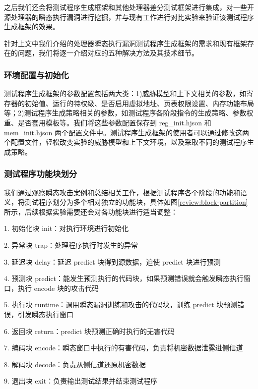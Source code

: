 之后我们还会将测试程序生成框架和其他处理器差分测试框架进行集成，对一些开源处理器的瞬态执行漏洞进行挖掘，并与现有工作进行对比实验来验证该测试程序生成框架的效果。\par

针对上文中我们介绍的处理器瞬态执行漏洞测试程序生成框架的需求和现有框架存在的问题，我们将逐一介绍对应的五种解决方法及其技术细节。\par

\subsubsection{环境配置与初始化}

测试程序生成框架的参数配置包括两大类：1)威胁模型和上下文相关的参数，如寄存器的初始值、运行的特权级、是否启用虚拟地址、页表权限设置、内存功能布局等；2)测试程序生成策略相关的参数，如测试程序各阶段指令的生成策略、参数权重、是否套用模板等。我们将这些参数配置保存到 reg\_init.hjson 和 mem\_init.hjson 两个配置文件中。测试程序生成框架的使用者可以通过修改这两个配置文件，轻松改变实验的威胁模型和上下文环境，以及采取不同的测试程序生成策略。\par

\subsubsection{测试程序功能块划分}

我们通过观察瞬态攻击案例和总结相关工作，根据测试程序各个阶段的功能和语义，将测试程序划分为多个相对独立的功能块，具体如图\ref{review:block-partition}所示，后续根据实验需要还会对各功能块进行适当调整：\par

1. 初始化块 init：对执行环境进行初始化\par
2. 异常块 trap：处理程序执行时发生的异常\par
3. 延迟块 delay：延迟 predict 块得到源数据，迫使 predict 块进行预测\par
4. 预测块 predict：能发生预测执行的代码块，如果预测错误就会触发瞬态执行窗口，执行 encode 块的攻击代码\par
5. 执行块 runtime：调用瞬态漏洞训练和攻击的代码块，训练 predict 块预测错误，引发瞬态执行窗口\par
6. 返回块 return：predict 块预测正确时执行的无害代码\par
7. 编码块 encode：瞬态窗口中执行的有害代码，负责将机密数据泄露进侧信道\par
8. 解码块 decode：负责从侧信道还原机密数据\par
9. 退出块 exit：负责输出测试结果并结束测试程序\par

